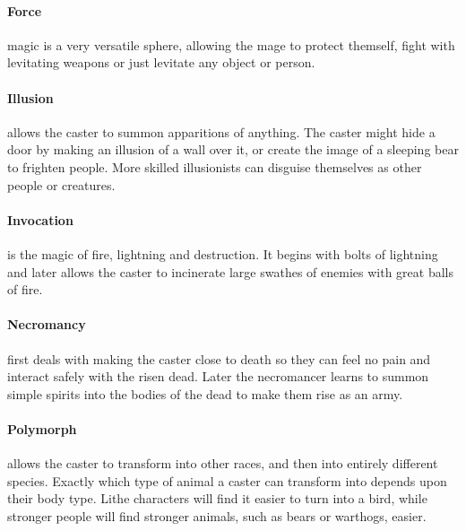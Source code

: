 {\begin{multicols}{2}
\paragraph{Force} magic is a very versatile sphere, allowing the mage to protect themself, fight with levitating weapons or just levitate any object or person.

\paragraph{Illusion} allows the caster to summon apparitions of anything. The caster might hide a door by making an illusion of a wall over it, or create the image of a sleeping bear to frighten people. More skilled illusionists can disguise themselves as other people or creatures.

\paragraph{Invocation} is the magic of fire, lightning and destruction. It begins with bolts of lightning and later allows the caster to incinerate large swathes of enemies with great balls of fire.

\paragraph{Necromancy} first deals with making the caster close to death so they can feel no pain and interact safely with the risen dead.
Later the necromancer learns to summon simple spirits into the bodies of the dead to make them rise as an army.

\paragraph{Polymorph} allows the caster to transform into other races, and then into entirely different species.
Exactly which type of animal a caster can transform into depends upon their body type.
Lithe characters will find it easier to turn into a bird, while stronger people will find stronger animals, such as bears or warthogs, easier.

\end{multicols}

}{}

\resumecontents[magic]


